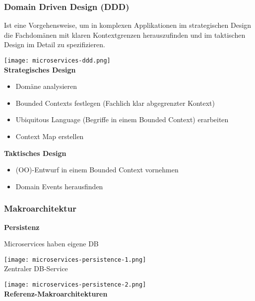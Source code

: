 \subsubsection{Domain Driven Design (DDD)}

Ist eine Vorgehensweise, um in komplexen Applikationen im strategischen Design die Fachdomänen mit klaren Kontextgrenzen herauszufinden und im taktischen Design im Detail zu spezifizieren.

\texttt{[image: microservices-ddd.png]} \\

\textbf{Strategisches Design}

\begin{itemize}
    \item Domäne analysieren
    \item Bounded Contexts festlegen (Fachlich klar abgegrenzter Kontext)
    \item Ubiquitous Language (Begriffe in einem Bounded Context) erarbeiten
    \item Context Map erstellen
\end{itemize}
\vspace{10pt}
\textbf{Taktisches Design}

\begin{itemize}
    \item (OO)-Entwurf in einem Bounded Context vornehmen
    \item Domain Events herausfinden
\end{itemize}
\vfill\null
\columnbreak
\subsubsection{Makroarchitektur}

\textbf{Persistenz}

Microservices haben eigene DB

\texttt{[image: microservices-persistence-1.png]} \\

Zentraler DB-Service

\texttt{[image: microservices-persistence-2.png]} \\

\textbf{Referenz-Makroarchitekturen}

